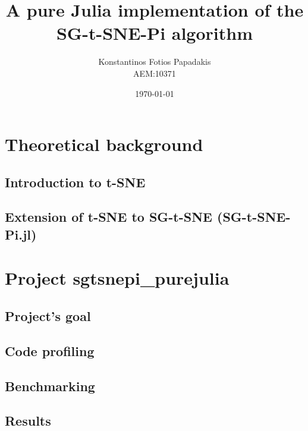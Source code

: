 \documentclass[twocolumn]{report}
\begin{document}
\title{\Huge \bfseries A pure Julia implementation of the SG-t-SNE-Pi algorithm} %
\author{Konstantinos Fotios Papadakis\vspace{0.5cm} \\  AEM:10371} %
\date{\today}
\maketitle

\tableofcontents



\chapter{Theoretical background}
\section{Introduction to t-SNE}

\section{Extension of t-SNE to SG-t-SNE (SG-t-SNE-Pi.jl)}


\chapter{Project sgtsnepi\_purejulia}
\section{Project's goal}

\section{Code profiling}

\section{Benchmarking}

\section{Results}

\end{document}

